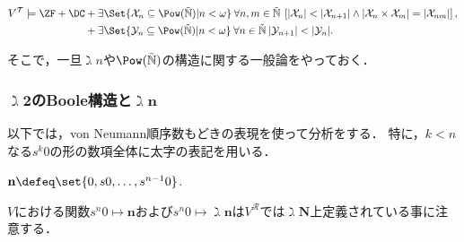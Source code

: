 \documentclass[realisability.tex]{subfiles}
\begin{document}
\begin{theorem}[Krivine]\label{thm:patho-sets-of-reals}
 \[
  V^{\mathcal{T}}
   \models \ZF + \DC
    \begin{aligned}[t]
     &+\exists \Set{ \mathcal{X}_n \subseteq \Pow(\NN) | n < \omega } \:
     \forall n, m \in \NN \:
    \left[|\mathcal{X}_{n}| < |\mathcal{X}_{n+1}| \land |\mathcal{X}_n \times \mathcal{X}_m| = |\mathcal{X}_{nm}|\right],\\
     &+ \exists \Set{ \mathcal{Y}_n \subseteq \Pow(\NN) | n <\omega} \: \forall n \in\NN \:
       |\mathcal{Y}_{n+1}| < |\mathcal{Y}_n|.
    \end{aligned}
 \]
\end{theorem}

そこで，一旦$\gimel n$や$\Pow(\NN)$の構造に関する一般論をやっておく．

\subsubsection{$\gimel \mathbf{2}$のBoole構造と$\gimel \mathbf{n}$}
以下では，von Neumann順序数もどきの表現を使って分析をする．
特に，$k < n$なる$s^k 0$の形の数項全体に太字の表記を用いる．
\begin{notation}
 $\mathbf{n} \defeq \set{0, s0, \dots, s^{n-1} 0}$.

 $V$における関数$s^n 0 \mapsto \mathbf{n}$および$s^n 0 \mapsto \gimel \mathbf{n}$は$V^{\mathcal{R}}$では$\gimel \mathbf{N}$上定義されている事に注意する．
\end{notation}
\end{document}
